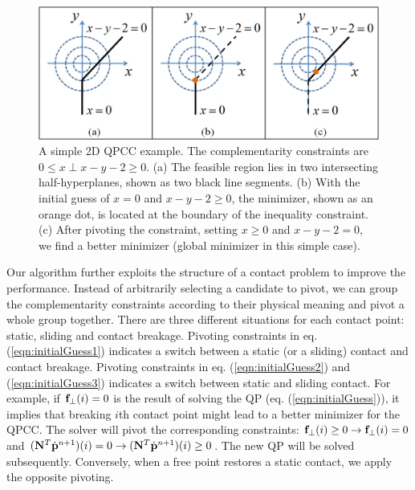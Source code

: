 \begin{figure}[!b]
  \centering
  \includegraphics[width=5in]{figures/QPCC.eps}
  \caption{A simple 2D QPCC example. The complementarity constraints are $0\leq x \perp x-y-2 \geq 0$. (a) The feasible region lies in two intersecting half-hyperplanes, shown as two black line segments. (b) With the initial guess of $x=0$ and $x-y-2\geq 0$, the minimizer, shown as an orange dot, is located at the boundary of the inequality constraint. (c) After pivoting the constraint, setting $x\geq 0$ and $x-y-2=0$, we find a better minimizer (global minimizer in this simple case).}
  \label{fig:QPCC}
\end{figure}

Our algorithm further exploits the structure of a contact problem to
improve the performance. Instead of arbitrarily selecting a candidate
to pivot, we can group the complementarity constraints according to
their physical meaning and pivot a whole group together. There are
three different situations for each contact point: static, sliding and
contact breakage. Pivoting constraints in eq.
(\ref{eqn:initialGuess1}) indicates a switch between a static (or a
sliding) contact and contact breakage.  Pivoting constraints in
eq. (\ref{eqn:initialGuess2}) and (\ref{eqn:initialGuess3})
indicates a switch between static and sliding contact. For example, if
$\mathbf{f}_{\perp}(i)=0$ is the result of solving the QP (eq.
(\ref{eqn:initialGuess})), it implies that breaking $i$th contact point
might lead to a better minimizer for the QPCC. The solver will pivot
the corresponding constraints: $\mathbf{f}_{\perp}(i) \geq 0 \rightarrow
\mathbf{f}_{\perp}(i) = 0$ and $(\mathbf{N}^T\dot{\mathbf{p}}^{n+1})(i) = 0
\rightarrow (\mathbf{N}^T\dot{\mathbf{p}}^{n+1})(i) \geq 0$. The new QP will
be solved subsequently. Conversely, when a free point restores a static
contact, we apply the opposite pivoting.

